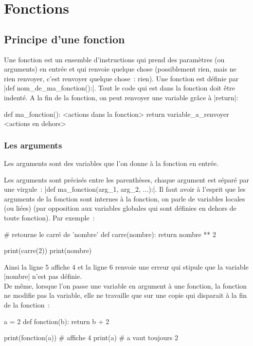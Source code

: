 \section{Fonctions}
	
	\subsection{Principe d'une fonction}
		
		Une fonction est un ensemble d'instructions qui prend des paramètres (ou arguments) en entrée et qui renvoie quelque chose (possiblement rien, mais ne rien renvoyer, c'est renvoyer quelque chose~: rien). Une fonction est définie par \python|def nom_de_ma_fonction():|. Tout le code qui est dans la fonction doit être indenté.
		A la fin de la fonction, on peut renvoyer une variable grâce à \python|return|:
		
		\begin{pythoncode}
			def ma_fonction():
				<actions dans la fonction>
				return variable_a_renvoyer
			<actions en dehors>
		\end{pythoncode}
		
		\subsubsection{Les arguments}
		Les arguments sont des variables que l'on donne à la fonction en entrée.
		
		Les arguments sont précisés entre les parenthèses, chaque argument est séparé par une virgule~: \python|def ma_fonction(arg_1, arg_2, ...):|.
		Il faut avoir à l'esprit que les arguments de la fonction sont internes à la fonction, on parle de variables locales (ou liées)
		(par opposition aux variables globales qui sont définies en dehors de toute fonction). Par exemple~:
		
		\begin{pythoncode}
			# retourne le carré de 'nombre'
			def carre(nombre):
				return nombre ** 2
			
			print(carre(2))
			print(nombre)
		\end{pythoncode}
		
		Ainsi la ligne 5 affiche 4 et la ligne 6 renvoie une erreur qui stipule que la variable \python|nombre| n'est pas définie. \\
		
		De même, lorsque l'on passe une variable en argument à une fonction, la fonction ne modifie pas la variable, elle ne travaille que sur une copie qui disparait à la fin de la fonction~:
		\begin{pythoncode}
			a = 2
			def fonction(b):
				return b + 2
			
			print(fonction(a)) # affiche 4
			print(a) # a vaut toujours 2
		\end{pythoncode}
		
